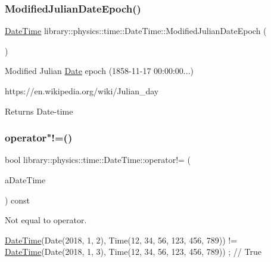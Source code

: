\subsubsection{\texorpdfstring{Modified\+Julian\+Date\+Epoch()}{ModifiedJulianDateEpoch()}}
{\footnotesize\ttfamily \hyperlink{classlibrary_1_1physics_1_1time_1_1_date_time}{Date\+Time} library\+::physics\+::time\+::\+Date\+Time\+::\+Modified\+Julian\+Date\+Epoch (\begin{DoxyParamCaption}{ }\end{DoxyParamCaption})\hspace{0.3cm}{\ttfamily [static]}}



Modified Julian \hyperlink{classlibrary_1_1physics_1_1time_1_1_date}{Date} epoch (1858-\/11-\/17 00\+:00\+:00...) 

https\+://en.wikipedia.\+org/wiki/\+Julian\+\_\+day

\begin{DoxyReturn}{Returns}
Date-\/time 
\end{DoxyReturn}
\mbox{\label{classlibrary_1_1physics_1_1time_1_1_date_time_adb0937a46bac7d64307e52dc323e405e}} 
\subsubsection{\texorpdfstring{operator"!=()}{operator!=()}}
{\footnotesize\ttfamily bool library\+::physics\+::time\+::\+Date\+Time\+::operator!= (\begin{DoxyParamCaption}\item[{const \hyperlink{classlibrary_1_1physics_1_1time_1_1_date_time}{Date\+Time} \&}]{a\+Date\+Time }\end{DoxyParamCaption}) const}



Not equal to operator. 


\begin{DoxyCode}
\hyperlink{classlibrary_1_1physics_1_1time_1_1_date_time_a4ea629e533f335c928e037c4ead4646e}{DateTime}(Date(2018, 1, 2), Time(12, 34, 56, 123, 456, 789)) != \hyperlink{classlibrary_1_1physics_1_1time_1_1_date_time_a4ea629e533f335c928e037c4ead4646e}{DateTime}(Date(2018, 1, 3), 
      Time(12, 34, 56, 123, 456, 789)) ; \textcolor{comment}{// True}
\end{DoxyCode}



